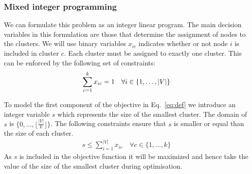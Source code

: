 \documentclass[conference]{IEEEtran}
\begin{document}
%
%


\subsubsection{Mixed integer programming}
We can formulate this problem as an integer linear program. The main
decision variables in this formulation are those that determine the
assignment of nodes to the clusters. We will use binary variables $x_{ic}$ indicates whether or not node $i$ is included in
cluster $c$. Each cluster must be assigned to exactly one cluster. This can be enforced by the following set of constraints:
%
\begin{equation}
\sum_{c=1}^k x_{ic} = 1 \quad \forall i \in \{1, \ldots, |V|\} \label{cons:assign}\\
\end{equation}

To model the first component of the objective in Eq.~\ref{eq:def} we introduce an integer variable $s$ which represents the size
of the smallest cluster. The domain of $s$ is
$\{0, \ldots, \lfloor \frac{|V|}{k} \rfloor \}$. The following constraints
ensure that $s$ is smaller or equal than the size of each cluster.
%
\begin{align}
s \leq \sum_{i=1}^{|V|} x_{ic} \quad \forall c \in \{1, \ldots, k\}
\end{align}
As $s$ is included in the objective function it will be maximized and hence take the value of the size of the smallest cluster during optimisation.
\end{document}
